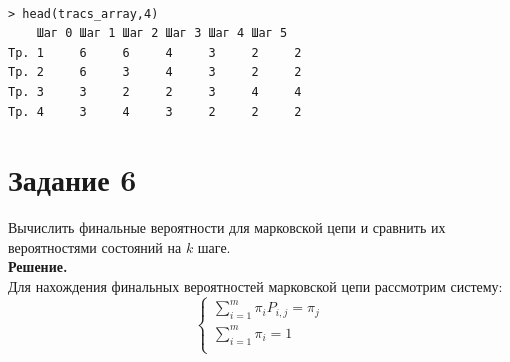 \documentclass[14pt,a4paper]{scrartcl}
\begin{document}
\begin{figure}[H]
	\begin{minipage}[h]{1\linewidth}
		  \\
	\end{minipage}
\end{figure}

\begin{verbatim}
> head(tracs_array,4)
	Шаг 0 Шаг 1 Шаг 2 Шаг 3 Шаг 4 Шаг 5
Тр. 1     6     6     4     3     2     2
Тр. 2     6     3     4     3     2     2
Тр. 3     3     2     2     3     4     4
Тр. 4     3     4     3     2     2     2
\end{verbatim}

\pagebreak
\section*{Задание 6}
Вычислить финальные вероятности для марковской цепи и сравнить их  вероятностями состояний на $k$ шаге.\\
\textbf{Решение.}\\

Для нахождения финальных вероятностей марковской цепи рассмотрим систему:
\begin{equation*}
	\begin{cases} 
		\sum\limits_{i=1}^m \pi_i P_{i,j} = \pi_j\\ 
		\sum\limits_{i=1}^m \pi_i = 1\\ 
	\end{cases}
\end{equation*}
\end{document}
